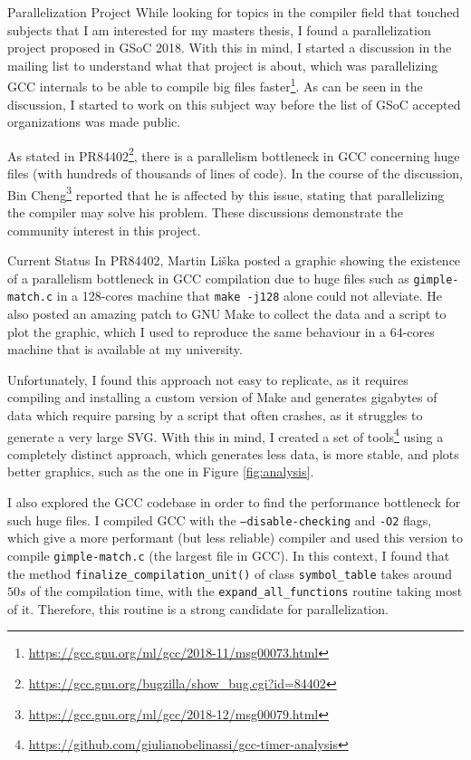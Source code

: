 \begin{section}{Parallelization Project}
While looking for topics in the compiler field that touched subjects that I
am interested for my masters thesis, I found a
parallelization project proposed in GSoC 2018. With this in mind, I started a
discussion in the mailing list to understand what that project is about,
which was parallelizing GCC internals to be able to compile big files
faster\footnote{\url{https://gcc.gnu.org/ml/gcc/2018-11/msg00073.html}}.
As can be seen in the discussion, I started to work on this subject way before
the list of GSoC accepted organizations was made public.

As stated in PR84402\footnote{\url{https://gcc.gnu.org/bugzilla/show\_bug.cgi?id=84402}},
there is a parallelism bottleneck in GCC concerning huge files (with hundreds of
thousands of lines of code). In the course of the discussion,
Bin Cheng\footnote{\url{https://gcc.gnu.org/ml/gcc/2018-12/msg00079.html}}
reported that
he is affected by this issue, stating that parallelizing the
compiler may solve his problem. These discussions demonstrate the
community interest in this project.

\begin{subsection}{Current Status}
In PR84402, Martin Liška posted a graphic showing the existence of a
parallelism bottleneck in GCC compilation due to huge files such as
\texttt{gimple-match.c} in a 128-cores machine that \texttt{make -j128} alone could not alleviate. He also posted an amazing patch to
GNU Make to collect the data and a script to plot the graphic, which I used
to reproduce the same behaviour in a 64-cores machine that is available at
my university.

Unfortunately, I found this approach not easy to replicate, as
it requires compiling and installing a custom version of Make and generates
gigabytes of data which require parsing by a script that often crashes, as
it struggles to generate a very large SVG. With this in mind, I created a set of
tools\footnote{\url{https://github.com/giulianobelinassi/gcc-timer-analysis}}
using a completely distinct approach, which generates less data, is more stable, and
plots better graphics, such as the one in Figure \ref{fig:analysis}.

I also explored the GCC codebase in order to find the performance bottleneck for
such huge files. I compiled GCC with the
\texttt{--disable-checking} and \texttt{-O2} flags, which
give a more performant (but less reliable) compiler and used this version to compile
\texttt{gimple-match.c} (the largest file in GCC). In this context, I found that the method
\texttt{finalize\_compilation\_unit()} of
class \texttt{symbol\_table} takes around $50s$ of the compilation time, with the
\texttt{expand\_all\_functions}
routine taking most of it. Therefore, this routine is a strong candidate for parallelization.


\end{subsection}
\end{section}
